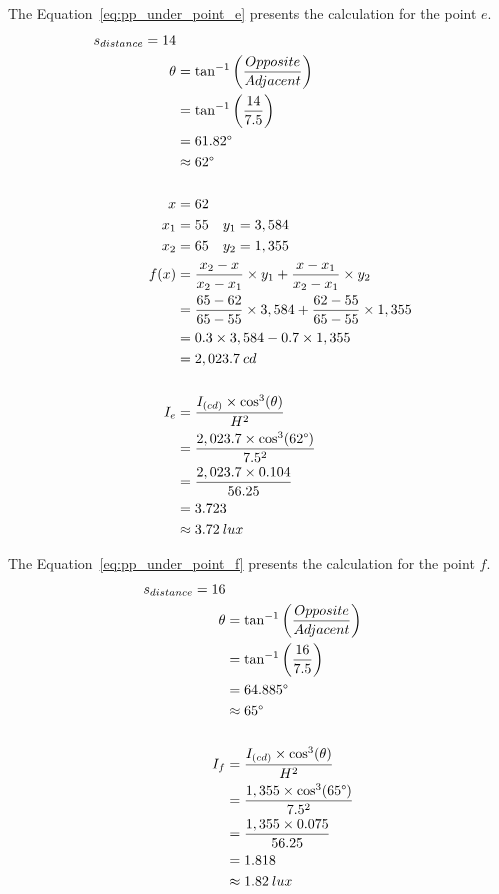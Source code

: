 The Equation~\ref{eq:pp_under_point_e} presents the calculation for the point $e$.
\begin{equation}
\begin{split}
s_{distance} = 14\\
\theta &= \tan^{-1}\left( \frac{Opposite}{Adjacent} \right) \\
 & = \tan^{-1}\left( \frac{14}{7.5} \right) \\
 & = 61.82\degree \\
 & \approx 62\degree\\
\\
x & = 62 \\
x_1 & = 55 \quad y_1 = 3,584 \\
x_2 & = 65 \quad y_2 =  1,355 \\
f(x) &= \frac{x_2 - x}{x_2 - x_1} \times y_1 +
       \frac{x - x_1}{x_2 - x_1} \times y_2 \\
 &= \frac{65 - 62}{65 - 55} \times 3,584 +
    \frac{62 - 55}{65 - 55} \times 1,355 \\
 & = 0.3 \times 3,584 - 0.7 \times 1,355 \\
 & = 2,023.7\: cd \\
\\
I_e &= \frac{I_{(cd)} \times \cos^3(\theta)}{H^2} \\
 &= \frac{2,023.7 \times \cos^3(62\degree)}{7.5^2} \\
 &= \frac{2,023.7 \times 0.104}{56.25} \\
 & = 3.723 \\
 & \approx 3.72\: lux
\end{split}
\label{eq:pp_under_point_e}
\end{equation}

The Equation~\ref{eq:pp_under_point_f} presents the calculation for the point $f$.
\begin{equation}
\begin{split}
s_{distance} = 16\\
\theta &= \tan^{-1}\left( \frac{Opposite}{Adjacent} \right) \\
 & = \tan^{-1}\left( \frac{16}{7.5} \right) \\
 & = 64.885\degree \\
 & \approx 65\degree\\
\\
I_f &= \frac{I_{(cd)} \times \cos^3(\theta)}{H^2} \\
 &= \frac{1,355 \times \cos^3(65\degree)}{7.5^2} \\
 &= \frac{1,355 \times 0.075}{56.25} \\
 & = 1.818 \\
 & \approx 1.82\: lux
\end{split}
\label{eq:pp_under_point_f}
\end{equation}

